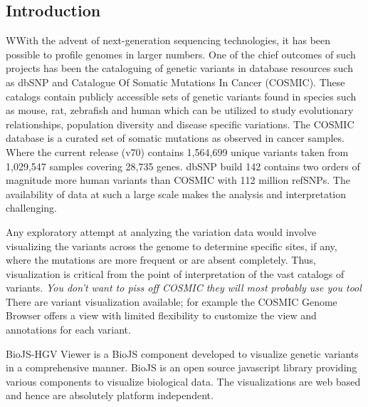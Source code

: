 \documentclass[twoside]{article}
\begin{document}
\begin{multicols}{2} %

\section{Introduction}

\lettrine[nindent=0em,lines=3]{W} 
With the advent of next-generation sequencing technologies, it has been possible to profile genomes in larger numbers. One of the chief outcomes of such projects has been the cataloguing of genetic variants in database resources such as dbSNP\cite{Smigielski2000} and Catalogue Of Somatic Mutations In Cancer (COSMIC)\cite{Forbes2011}. These catalogs contain publicly accessible sets of genetic variants found in species such as mouse, rat, zebrafish and human which can be utilized to study evolutionary relationships, population diversity and disease specific variations. The COSMIC database is a curated set of somatic mutations as observed in cancer samples. Where the current release (v70) contains 1,564,699 unique variants taken from 1,029,547 samples covering 28,735 genes.  dbSNP build 142 contains two orders of magnitude more human variants than COSMIC with 112 million refSNPs\cite{ncbiweb}. The availability of data at such a large scale makes the analysis and interpretation challenging.

Any exploratory attempt at analyzing the variation data would involve visualizing the variants across the genome to determine specific sites, if any, where the mutations are more frequent or are absent completely. Thus, visualization is critical from the point of interpretation of the vast catalogs of variants. \textit{You don't want to piss off COSMIC they will most probably use you tool} There are variant visualization available; for example the COSMIC Genome Browser\cite{Forbes2011} offers a view with limited flexibility to customize the view and annotations for each variant.


 BioJS-HGV Viewer is a BioJS \cite{Corpas2014} component developed to visualize genetic variants in a comprehensive manner. BioJS is an open source javascript library providing various components to visualize biological data. The visualizations are web based and hence are absolutely platform independent.
 
 


\end{multicols}
\end{document}
